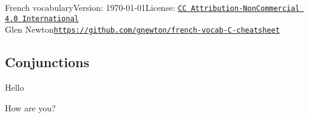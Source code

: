 \documentclass[10pt,landscape,letter]{article}
\begin{document}
{
\Large French vocabulary\hfill \small Version: \today\hfill License: \href{https://creativecommons.org/licenses/by-nc/4.0/}{\tt CC Attribution-NonCommercial 4.0 International}}\\
 {Glen Newton}\hfill {\tt \url{https://github.com/gnewton/french-vocab-C-cheatsheet}}
    
\footnotesize
\begin{multicols*}{4}







  \section{Conjunctions}
  Hello

  How are you?
  
\end{multicols*}
\end{document}
